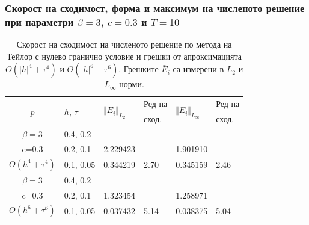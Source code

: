\documentclass[a4paper]{article}
\theoremstyle{remark}
\begin{document}
\begin{large}
\subsubsection{Скорост на сходимост, форма и максимум на численото решение при параметри $\beta = 3$, $c=0.3$ и $T=10$}
\begin{table}[ht]
\centering
\small
		\begin{tabular}{||c|l|ll|ll||}
			\hline
			\hline
      \multirow{2  }{*}{ $p$ }        & \multirow{2  }{*}{$h$, $\tau$}  &  	\multirow{2  }{*}{ $\Vert \bar{ E_i} \Vert_{L_2}$ }	&Ред на	& \multirow{2  }{*}{ $\Vert \bar{ E_i} \Vert_{L_\infty}$ } 		&Ред на   \\
	                                        &                                                & 							 					&  сход. 	& 								       					& сход. \\
\hline 
\hline 
       $\beta=3$        	&0.4, 0.2      &             	&            &           &   \\
           c=0.3    		&0.2, 0.1      &  2.229423 &            & 1.901910 &   \\
  $O(h^4+ \tau^4)$  	&0.1, 0.05   	&  0.344219 	&2.70  	 & 0.345159  &  2.46 \\

\hline
  $\beta=3$     		&0.4, 0.2   	&            	&          	&                  &      \\
      c=0.3                  &0.2, 0.1   	& 1.323454  &            &1.258971 &   \\
 $O(h^6+ \tau^6)$ 	&0.1, 0.05 	&  0.037432 	&5.14  	 &0.038375  & 5.04 \\
\hline
\hline 
		\end{tabular}
		\caption{Скорост на сходимост на численото решение по метода на Тейлор с нулево гранично условие и грешки от апроксимацията $O(|h|^{4} + \tau^4 )$ и $O(|h|^{6} + \tau^6 )$. Грешките $\bar E_i$ са измерени в $L_2$ и $L_\infty$ норми.}
\label{tableH}
\end{table}


\end{large}
\end{document}
